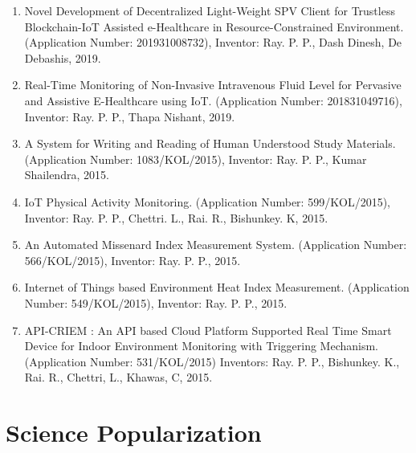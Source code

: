 \documentclass[11pt,a4paper]{moderncv}
\begin{document}
\begin{adjustwidth}{6em}{0pt}
	\begin{enumerate}
		
		\item Novel Development of Decentralized Light-Weight SPV Client for Trustless Blockchain-IoT Assisted e-Healthcare in Resource-Constrained Environment. (Application Number: 201931008732), Inventor: Ray. P. P., Dash Dinesh, De Debashis, 2019.
		
		\item Real-Time Monitoring of Non-Invasive Intravenous Fluid Level for Pervasive and Assistive E-Healthcare using IoT. (Application Number: 201831049716), Inventor: Ray. P. P., Thapa Nishant, 2019.
		
		\item A System for Writing and Reading of Human Understood Study Materials. (Application Number: 1083/KOL/2015), Inventor: Ray. P. P., Kumar Shailendra, 2015.
		
		\item IoT Physical Activity Monitoring. (Application Number: 599/KOL/2015), Inventor: Ray. P. P., Chettri. L., Rai. R., Bishunkey. K, 2015.
		
		\item An Automated Missenard Index Measurement System. (Application Number: 566/KOL/2015), Inventor: Ray. P. P., 2015.
		
		\item Internet of Things based Environment Heat Index Measurement. (Application Number: 549/KOL/2015), Inventor: Ray. P. P., 2015.
		
		\item API-CRIEM : An API based Cloud Platform Supported Real Time Smart Device for Indoor Environment Monitoring with Triggering Mechanism. (Application Number: 531/KOL/2015) Inventors: Ray. P. P., Bishunkey. K., Rai. R., Chettri, L., Khawas, C, 2015.
		
		
	\end{enumerate}
\end{adjustwidth}




\section{\textbf{Science Popularization}}
\end{document}
